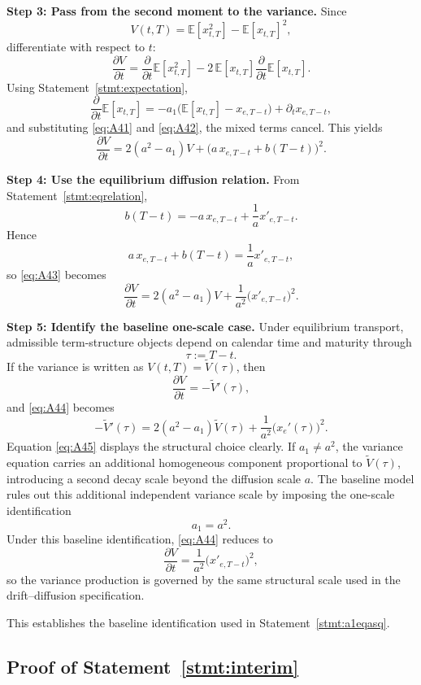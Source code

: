 \documentclass[12pt]{article}
\theoremstyle{statementstyle}
\begin{document}
\begin{appendices}
\medskip
\noindent\textbf{Step 3: Pass from the second moment to the variance.}
Since
\[
V(t,T)=\mathbb{E}[x_{t,T}^2]-\mathbb{E}[x_{t,T}]^2,
\]
differentiate with respect to \(t\):
\[
\frac{\partial V}{\partial t}
=
\frac{\partial}{\partial t}\mathbb{E}[x_{t,T}^2]
-
2\,\mathbb{E}[x_{t,T}]
\frac{\partial}{\partial t}\mathbb{E}[x_{t,T}].
\]
Using Statement~\ref{stmt:expectation},
\[
\frac{\partial}{\partial t}\mathbb{E}[x_{t,T}]
=
-a_1\bigl(\mathbb{E}[x_{t,T}]-x_{e,T-t}\bigr)
+
\partial_t x_{e,T-t},
\tag{A.4.2}\label{eq:A42}
\]
and substituting \eqref{eq:A41} and \eqref{eq:A42}, the mixed terms cancel. This yields
\[
\frac{\partial V}{\partial t}
=
2(a^2-a_1)V
+
\bigl(a\,x_{e,T-t}+b(T-t)\bigr)^2.
\tag{A.4.3}\label{eq:A43}
\]

\medskip
\noindent\textbf{Step 4: Use the equilibrium diffusion relation.}
From Statement~\ref{stmt:eqrelation},
\[
b(T-t)=-a\,x_{e,T-t}+\frac{1}{a}x'_{e,T-t}.
\]
Hence
\[
a\,x_{e,T-t}+b(T-t)=\frac{1}{a}x'_{e,T-t},
\]
so \eqref{eq:A43} becomes
\[
\frac{\partial V}{\partial t}
=
2(a^2-a_1)V
+
\frac{1}{a^2}\bigl(x'_{e,T-t}\bigr)^2.
\tag{A.4.4}\label{eq:A44}
\]

\medskip
\noindent\textbf{Step 5: Identify the baseline one-scale case.}
Under equilibrium transport, admissible term-structure objects depend on calendar
time and maturity through
\[
\tau:=T-t.
\]
If the variance is written as \(V(t,T)=\widetilde V(\tau)\), then
\[
\frac{\partial V}{\partial t}=-\widetilde V'(\tau),
\]
and \eqref{eq:A44} becomes
\[
-\widetilde V'(\tau)
=
2(a^2-a_1)\widetilde V(\tau)
+
\frac{1}{a^2}\bigl(x_e'(\tau)\bigr)^2.
\tag{A.4.5}\label{eq:A45}
\]
Equation \eqref{eq:A45} displays the structural choice clearly. If
\(a_1\neq a^2\), the variance equation carries an additional homogeneous
component proportional to \(\widetilde V(\tau)\), introducing a second decay scale
beyond the diffusion scale \(a\). The baseline model rules out this additional
independent variance scale by imposing the one-scale identification
\[
a_1=a^2.
\tag{A.4.6}\label{eq:A46}
\]
Under this baseline identification, \eqref{eq:A44} reduces to
\[
\frac{\partial V}{\partial t}
=
\frac{1}{a^2}\bigl(x'_{e,T-t}\bigr)^2,
\]
so the variance production is governed by the same structural scale used in the
drift--diffusion specification.

This establishes the baseline identification used in Statement~\ref{stmt:a1eqasq}.

\subsection{Proof of Statement~\ref{stmt:interim}}
\label{appendix:A5}


\end{appendices}
\end{document}
